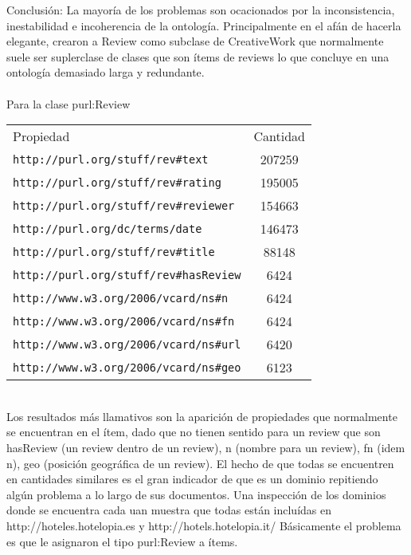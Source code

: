 Conclusión: La mayoría de los problemas son ocacionados por la inconsistencia, inestabilidad e incoherencia de la ontología. Principalmente 
 en el afán de hacerla elegante, crearon a Review como subclase de CreativeWork que normalmente suele ser suplerclase de clases que son ítems de reviews
 lo que concluye en una ontología demasiado larga y redundante.
 \\
 \\
 Para la clase purl:Review\\
 \begin{tabular}{| l | c | }
 Propiedad & Cantidad \\
 \verb|http://purl.org/stuff/rev#text| & 207259\\
 \verb|http://purl.org/stuff/rev#rating| & 195005\\
 \verb|http://purl.org/stuff/rev#reviewer| & 154663\\
 \verb|http://purl.org/dc/terms/date| & 146473\\
 \verb|http://purl.org/stuff/rev#title| & 88148\\
 \verb|http://purl.org/stuff/rev#hasReview| & 6424\\
 \verb|http://www.w3.org/2006/vcard/ns#n| & 6424\\
 \verb|http://www.w3.org/2006/vcard/ns#fn| & 6424\\
 \verb|http://www.w3.org/2006/vcard/ns#url| & 6420\\
 \verb|http://www.w3.org/2006/vcard/ns#geo| & 6123
\end{tabular}
\\ 

Los resultados más llamativos son la aparición de propiedades que normalmente se encuentran en el ítem, dado que no tienen sentido para un review
que son hasReview (un review dentro de un review), n (nombre para un review), fn (idem n), geo (posición geográfica de un review).
El hecho de que todas se encuentren en cantidades similares es el gran indicador de que es un dominio repitiendo algún problema a lo largo de sus documentos.
Una inspección de los dominios donde se encuentra cada uan muestra que todas están incluídas en http://hoteles.hotelopia.es y http://hotels.hotelopia.it/
Básicamente el problema es que le asignaron el tipo purl:Review a ítems.




